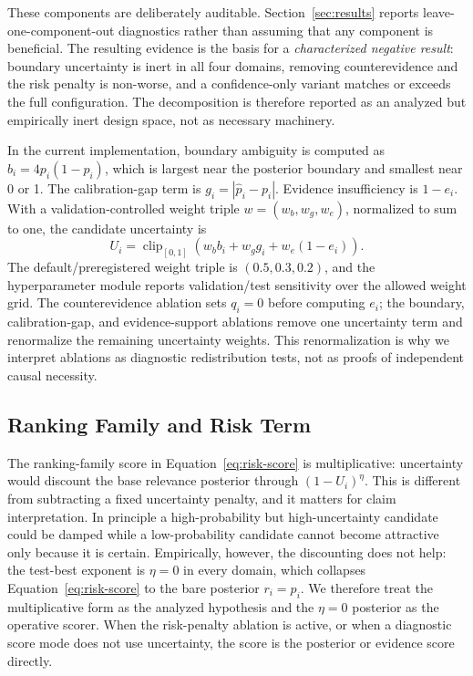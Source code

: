 These components are deliberately auditable. Section~\ref{sec:results}
reports leave-one-component-out diagnostics rather than assuming that any
component is beneficial. The resulting evidence is the basis for a
\emph{characterized negative result}: boundary uncertainty is inert in all four
domains, removing counterevidence and the risk penalty is non-worse, and a
confidence-only variant matches or exceeds the full configuration. The
decomposition is therefore reported as an analyzed but empirically inert design
space, not as necessary machinery.

In the current implementation, boundary ambiguity is computed as
$b_i=4p_i(1-p_i)$, which is largest near the posterior boundary and smallest
near 0 or 1. The calibration-gap term is $g_i=|\hat{p}_i-p_i|$. Evidence
insufficiency is $1-e_i$. With a validation-controlled weight triple
$w=(w_b,w_g,w_e)$, normalized to sum to one, the candidate uncertainty is
\begin{equation}
    U_i = \operatorname{clip}_{[0,1]}
    \left(w_b b_i + w_g g_i + w_e(1-e_i)\right).
    \label{eq:uncertainty}
\end{equation}
The default/preregistered weight triple is $(0.5,0.3,0.2)$, and the
hyperparameter module reports validation/test sensitivity over the allowed
weight grid. The counterevidence ablation sets $q_i=0$ before computing
$e_i$; the boundary, calibration-gap, and evidence-support ablations remove
one uncertainty term and renormalize the remaining uncertainty weights. This
renormalization is why we interpret ablations as diagnostic redistribution
tests, not as proofs of independent causal necessity.

\subsection{Ranking Family and Risk Term}

The ranking-family score in Equation~\ref{eq:risk-score} is multiplicative:
uncertainty would discount the base relevance posterior through $(1-U_i)^\eta$.
This is different from subtracting a fixed uncertainty penalty, and it matters
for claim interpretation. In principle a high-probability but high-uncertainty
candidate could be damped while a low-probability candidate cannot become
attractive only because it is certain. Empirically, however, the
discounting does not help: the test-best exponent is $\eta=0$ in every domain,
which collapses Equation~\ref{eq:risk-score} to the bare posterior $r_i=p_i$.
We therefore treat the multiplicative form as the analyzed hypothesis and the
$\eta=0$ posterior as the operative scorer. When the risk-penalty ablation is
active, or when a diagnostic score mode does not use uncertainty, the score is
the posterior or evidence score directly.

